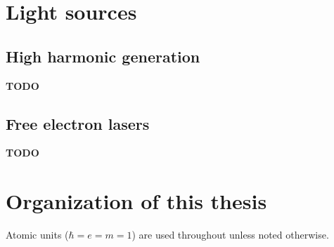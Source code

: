\section{Light sources}
\subsection{High harmonic generation} %
\label{sub:high_harmonic_generation}
\textbf{TODO}

\subsection{Free electron lasers} %
\label{sub:free_electron_lasers}
\textbf{TODO}

\section{Organization of this thesis} %
\label{sec:organization_of_this_thesis}

Atomic units ($\hbar=e=m=1$) are used throughout unless noted otherwise.
